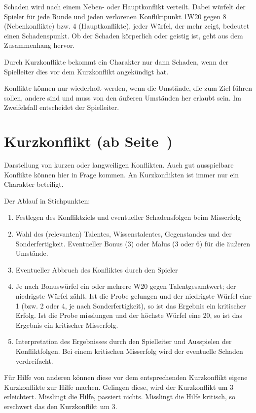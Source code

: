 Schaden wird nach einem Neben- oder Hauptkonflikt verteilt. Dabei würfelt der Spieler für jede Runde und jeden verlorenen Konfliktpunkt 1W20 gegen 8 (Nebenkonflikte) bzw. 4 (Hauptkonflikte), jeder Würfel, der mehr zeigt, bedeutet einen Schadenspunkt. Ob der Schaden körperlich oder geistig ist, geht aus dem Zusammenhang hervor.

Durch Kurzkonflikte bekommt ein Charakter nur dann Schaden, wenn der Spielleiter dies vor dem Kurzkonflikt angekündigt hat.

Konflikte können nur wiederholt werden, wenn die Umstände, die zum Ziel führen sollen, andere sind und muss von den äußeren Umständen her erlaubt sein. Im Zweifelsfall entscheidet der Spielleiter.

\section[Kurzkonflikt]{Kurzkonflikt (ab Seite~\pageref{Sec:Kurzkonflikt})}
Darstellung von kurzen oder langweiligen Konflikten. Auch gut ausspielbare Konflikte können hier in Frage kommen. An Kurzkonflikten ist immer nur ein Charakter beteiligt.

Der Ablauf in Stichpunkten:
\begin{enumerate}
\item Festlegen des Konfliktziels und eventueller Schadensfolgen beim Misserfolg
\item Wahl des (relevanten) Talentes, Wissenstalentes, Gegenstandes und der Sonderfertigkeit. Eventueller Bonus (3) oder Malus (3 oder 6) für die äußeren Umstände.
\item Eventueller Abbruch des Konfliktes durch den Spieler
\item Je nach Bonuswürfel ein oder mehrere W20 gegen Talentgesamtwert; der niedrigste Würfel zählt. Ist die Probe gelungen und der niedrigste Würfel eine 1 (bzw. 2 oder 4, je nach Sonderfertigkeit), so ist das Ergebnis ein kritischer Erfolg. Ist die Probe misslungen und der höchste Würfel eine 20, so ist das Ergebnis ein kritischer Misserfolg.
\item Interpretation des Ergebnisses durch den Spielleiter und Ausspielen der Konfliktfolgen. Bei einem kritischen Misserfolg wird der eventuelle Schaden verdreifacht.
\end{enumerate}

Für Hilfe von anderen können diese vor dem entsprechenden Kurzkonflikt eigene Kurzkonflikte zur Hilfe machen. Gelingen diese, wird der Kurzkonflikt um 3 erleichtert. Misslingt die Hilfe, passiert nichts. Misslingt die Hilfe kritisch, so erschwert das den Kurzkonflikt um 3.

